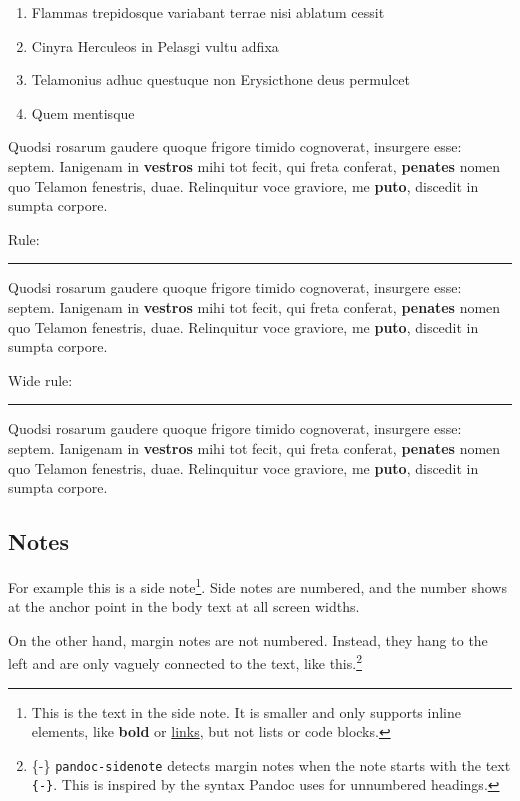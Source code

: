 \documentclass[
]{tufte-pandoc}
\providecommand{\tightlist}{%
  \setlength{\itemsep}{0pt}\setlength{\parskip}{0pt}}
\begin{document}
\begin{enumerate}
\def\labelenumi{\arabic{enumi}.}
\tightlist
\item
  Flammas trepidosque variabant terrae nisi ablatum cessit
\item
  Cinyra Herculeos in Pelasgi vultu adfixa
\item
  Telamonius adhuc questuque non Erysicthone deus permulcet
\item
  Quem mentisque
\end{enumerate}

Quodsi rosarum gaudere quoque frigore timido cognoverat, insurgere esse:
septem. Ianigenam in \textbf{vestros} mihi tot fecit, qui freta
conferat, \textbf{penates} nomen quo Telamon fenestris, duae.
Relinquitur voce graviore, me \textbf{puto}, discedit in sumpta corpore.

Rule:

\begin{center}\rule{0.5\linewidth}{0.5pt}\end{center}

Quodsi rosarum gaudere quoque frigore timido cognoverat, insurgere esse:
septem. Ianigenam in \textbf{vestros} mihi tot fecit, qui freta
conferat, \textbf{penates} nomen quo Telamon fenestris, duae.
Relinquitur voce graviore, me \textbf{puto}, discedit in sumpta corpore.

Wide rule:

\begin{center}\rule{0.5\linewidth}{0.5pt}\end{center}

Quodsi rosarum gaudere quoque frigore timido cognoverat, insurgere esse:
septem. Ianigenam in \textbf{vestros} mihi tot fecit, qui freta
conferat, \textbf{penates} nomen quo Telamon fenestris, duae.
Relinquitur voce graviore, me \textbf{puto}, discedit in sumpta corpore.

\hypertarget{notes}{%
\subsection{Notes}\label{notes}}

For example this is a side note\footnote{This is the text in the side
  note. It is smaller and only supports inline elements, like
  \textbf{bold} or \protect\hyperlink{}{links}, but not lists or code
  blocks.}. Side notes are numbered, and the number shows at the anchor
point in the body text at all screen widths.

On the other hand, margin notes are not numbered. Instead, they hang to
the left and are only vaguely connected to the text, like
this.\footnote{\{-\} \texttt{pandoc-sidenote} detects margin notes when
  the note starts with the text \texttt{\{-\}}. This is inspired by the
  syntax Pandoc uses for unnumbered headings.}
\end{document}
